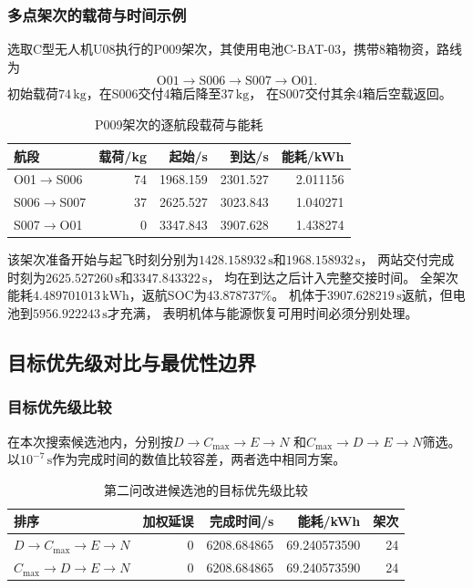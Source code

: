\documentclass[bwprint]{gmcmthesis}
\begin{document}
\subsubsection{多点架次的载荷与时间示例}
选取C型无人机U08执行的P009架次，其使用电池C-BAT-03，携带8箱物资，路线为
\begin{equation}
\mathrm{O01}\rightarrow\mathrm{S006}\rightarrow\mathrm{S007}\rightarrow\mathrm{O01}.
\end{equation}
初始载荷$74\,\mathrm{kg}$，在S006交付4箱后降至$37\,\mathrm{kg}$，
在S007交付其余4箱后空载返回。
\begin{table}[htbp]
\centering
\small
\caption{P009架次的逐航段载荷与能耗}
\label{tab:q2_multistop}
\begin{tabular}{lrrrr}
\toprule
航段 & 载荷/kg & 起始/s & 到达/s & 能耗/kWh \\
\midrule
O01$\rightarrow$S006 & 74 & 1968.159 & 2301.527 & 2.011156 \\
S006$\rightarrow$S007 & 37 & 2625.527 & 3023.843 & 1.040271 \\
S007$\rightarrow$O01 & 0 & 3347.843 & 3907.628 & 1.438274 \\
\bottomrule
\end{tabular}
\end{table}

该架次准备开始与起飞时刻分别为$1428.158932\,\mathrm{s}$和$1968.158932\,\mathrm{s}$，
两站交付完成时刻为$2625.527260\,\mathrm{s}$和$3347.843322\,\mathrm{s}$，
均在到达之后计入完整交接时间。
全架次能耗$4.489701013\,\mathrm{kWh}$，返航SOC为$43.878737\%$。
机体于$3907.628219\,\mathrm{s}$返航，但电池到$5956.922243\,\mathrm{s}$才充满，
表明机体与能源恢复可用时间必须分别处理。

\subsection{目标优先级对比与最优性边界}
\subsubsection{目标优先级比较}
在本次搜索候选池内，分别按$D\rightarrow C_{\max}\rightarrow E\rightarrow N$
和$C_{\max}\rightarrow D\rightarrow E\rightarrow N$筛选。
以$10^{-7}\,\mathrm{s}$作为完成时间的数值比较容差，两者选中相同方案。
\begin{table}[htbp]
\centering
\small
\caption{第二问改进候选池的目标优先级比较}
\label{tab:q2_priority}
\begin{tabular}{lrrrr}
\toprule
排序 & 加权延误 & 完成时间/s & 能耗/kWh & 架次 \\
\midrule
$D\to C_{\max}\to E\to N$ & 0 & 6208.684865 & 69.240573590 & 24 \\
$C_{\max}\to D\to E\to N$ & 0 & 6208.684865 & 69.240573590 & 24 \\
\bottomrule
\end{tabular}
\end{table}
\end{document}
